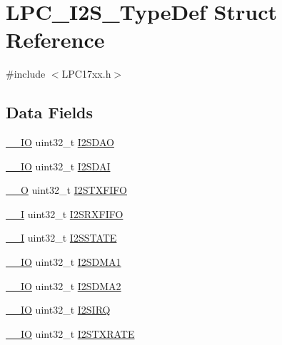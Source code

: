 \hypertarget{structLPC__I2S__TypeDef}{}\section{L\+P\+C\+\_\+\+I2\+S\+\_\+\+Type\+Def Struct Reference}
\label{structLPC__I2S__TypeDef}


{\ttfamily \#include $<$L\+P\+C17xx.\+h$>$}

\subsection*{Data Fields}
\begin{DoxyCompactItemize}
\item 
\hyperlink{LPC17xx_8h_aec43007d9998a0a0e01faede4133d6be}{\+\_\+\+\_\+\+IO} uint32\+\_\+t \hyperlink{structLPC__I2S__TypeDef_ae4208fc514ea78b5f7941017c1f67959}{I2\+S\+D\+AO}
\item 
\hyperlink{LPC17xx_8h_aec43007d9998a0a0e01faede4133d6be}{\+\_\+\+\_\+\+IO} uint32\+\_\+t \hyperlink{structLPC__I2S__TypeDef_a9f541e2ce6e843fc6d162c627561f88f}{I2\+S\+D\+AI}
\item 
\hyperlink{LPC17xx_8h_a7e25d9380f9ef903923964322e71f2f6}{\+\_\+\+\_\+O} uint32\+\_\+t \hyperlink{structLPC__I2S__TypeDef_a2d49566bdca12980b001175683fe0fde}{I2\+S\+T\+X\+F\+I\+FO}
\item 
\hyperlink{LPC17xx_8h_af63697ed9952cc71e1225efe205f6cd3}{\+\_\+\+\_\+I} uint32\+\_\+t \hyperlink{structLPC__I2S__TypeDef_ab5ecf82c8d91e52138f639f5ff410940}{I2\+S\+R\+X\+F\+I\+FO}
\item 
\hyperlink{LPC17xx_8h_af63697ed9952cc71e1225efe205f6cd3}{\+\_\+\+\_\+I} uint32\+\_\+t \hyperlink{structLPC__I2S__TypeDef_a7676081d47f5ccc4b860ae54d00e4223}{I2\+S\+S\+T\+A\+TE}
\item 
\hyperlink{LPC17xx_8h_aec43007d9998a0a0e01faede4133d6be}{\+\_\+\+\_\+\+IO} uint32\+\_\+t \hyperlink{structLPC__I2S__TypeDef_a74f0d6632b57ee8a2b0bab605cae3542}{I2\+S\+D\+M\+A1}
\item 
\hyperlink{LPC17xx_8h_aec43007d9998a0a0e01faede4133d6be}{\+\_\+\+\_\+\+IO} uint32\+\_\+t \hyperlink{structLPC__I2S__TypeDef_a0beac2c6380bac635ec590e2f42c9a54}{I2\+S\+D\+M\+A2}
\item 
\hyperlink{LPC17xx_8h_aec43007d9998a0a0e01faede4133d6be}{\+\_\+\+\_\+\+IO} uint32\+\_\+t \hyperlink{structLPC__I2S__TypeDef_aa90732c12a0e83e0d07cace0b6847403}{I2\+S\+I\+RQ}
\item 
\hyperlink{LPC17xx_8h_aec43007d9998a0a0e01faede4133d6be}{\+\_\+\+\_\+\+IO} uint32\+\_\+t \hyperlink{structLPC__I2S__TypeDef_ac35b10a16f9f7276b679a4470a1ddcad}{I2\+S\+T\+X\+R\+A\+TE}

\end{DoxyCompactItemize}
